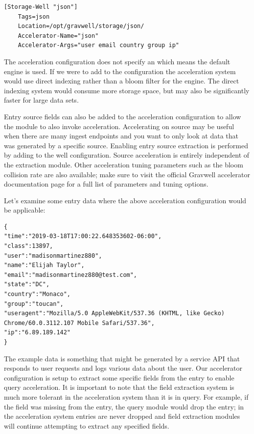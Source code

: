 {\begin{Verbatim}[breaklines=true]
[Storage-Well "json"]
    Tags=json
    Location=/opt/gravwell/storage/json/
    Accelerator-Name="json"
    Accelerator-Args="user email country group ip"
\end{Verbatim}

The acceleration configuration does not specify an
 which means the default engine 
 is used. If we were to add
 to the configuration the
acceleration system would use direct indexing rather than a bloom filter
for the engine. The direct indexing system would consume more storage
space, but may also be significantly faster for large data sets.

Entry source fields can also be added to the acceleration configuration
to allow the  module to also invoke acceleration. Accelerating
on source may be useful when there are many ingest endpoints and you
want to only look at data that was generated by a specific source.
Enabling entry source extraction is performed by adding
 to the well configuration. Source
acceleration is entirely independent of the extraction module. Other
acceleration tuning parameters such as the bloom collision rate are also
available; make sure to visit the official Gravwell accelerator
documentation page for a full list of parameters and tuning options.

Let's examine some entry data where the above acceleration
configuration would be applicable:

\begin{Verbatim}[breaklines=true]
{
"time":"2019-03-18T17:00:22.648353602-06:00",
"class":13897,
"user":"madisonmartinez880",
"name":"Elijah Taylor",
"email":"madisonmartinez880@test.com",
"state":"DC",
"country":"Monaco",
"group":"toucan",
"useragent":"Mozilla/5.0 AppleWebKit/537.36 (KHTML, like Gecko) 
Chrome/60.0.3112.107 Mobile Safari/537.36",
"ip":"6.89.189.142"
}
\end{Verbatim}

The example data is something that might be generated by a service API
that responds to user requests and logs various data about the user.
Our accelerator configuration is setup to extract some specific fields
from the entry to enable query acceleration. It is important to note
that the field extraction system is much more tolerant in the
acceleration system than it is in query. For example, if the field
 was missing from the entry, the  query module would drop
the entry; in the acceleration system entries are never dropped and
field extraction modules will continue attempting to extract any
specified fields.

}
